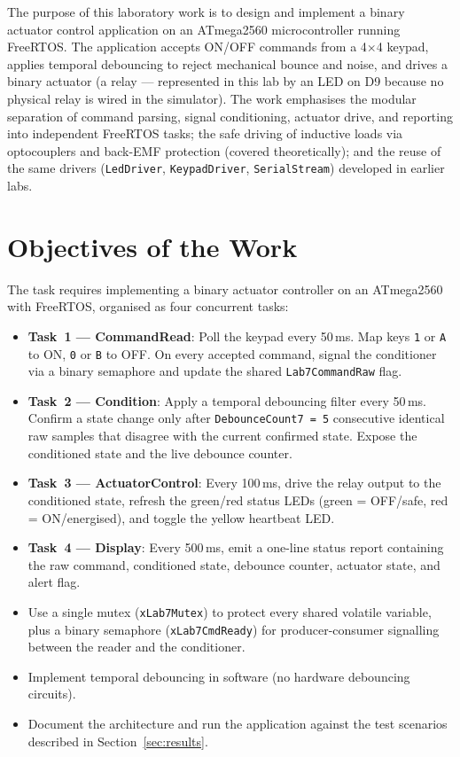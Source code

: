 \documentclass[12pt]{article}
\begin{document}
The purpose of this laboratory work is to design and implement a binary actuator control application on an ATmega2560 microcontroller running FreeRTOS. The application accepts ON/OFF commands from a 4$\times$4 keypad, applies temporal debouncing to reject mechanical bounce and noise, and drives a binary actuator (a relay --- represented in this lab by an LED on D9 because no physical relay is wired in the simulator). The work emphasises the modular separation of command parsing, signal conditioning, actuator drive, and reporting into independent FreeRTOS tasks; the safe driving of inductive loads via optocouplers and back-EMF protection (covered theoretically); and the reuse of the same drivers (\texttt{LedDriver}, \texttt{KeypadDriver}, \texttt{SerialStream}) developed in earlier labs.

\section{Objectives of the Work}

The task requires implementing a binary actuator controller on an ATmega2560 with FreeRTOS, organised as four concurrent tasks:
\begin{itemize}
  \item \textbf{Task~1 --- CommandRead}: Poll the keypad every 50\,ms. Map keys \texttt{1} or \texttt{A} to ON, \texttt{0} or \texttt{B} to OFF. On every accepted command, signal the conditioner via a binary semaphore and update the shared \texttt{Lab7CommandRaw} flag.
  \item \textbf{Task~2 --- Condition}: Apply a temporal debouncing filter every 50\,ms. Confirm a state change only after \texttt{DebounceCount7 = 5} consecutive identical raw samples that disagree with the current confirmed state. Expose the conditioned state and the live debounce counter.
  \item \textbf{Task~3 --- ActuatorControl}: Every 100\,ms, drive the relay output to the conditioned state, refresh the green/red status LEDs (green = OFF/safe, red = ON/energised), and toggle the yellow heartbeat LED.
  \item \textbf{Task~4 --- Display}: Every 500\,ms, emit a one-line status report containing the raw command, conditioned state, debounce counter, actuator state, and alert flag.
  \item Use a single mutex (\texttt{xLab7Mutex}) to protect every shared volatile variable, plus a binary semaphore (\texttt{xLab7CmdReady}) for producer-consumer signalling between the reader and the conditioner.
  \item Implement temporal debouncing in software (no hardware debouncing circuits).
  \item Document the architecture and run the application against the test scenarios described in Section~\ref{sec:results}.
\end{itemize}
\end{document}
